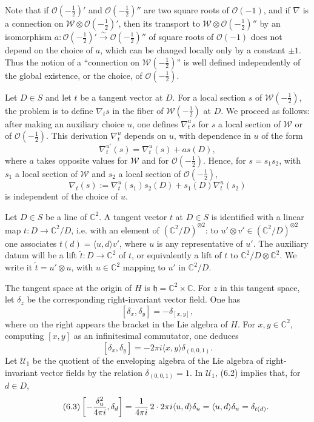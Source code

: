 \documentclass[11pt]{article}
\newcommand{\C}{\mathbb C}
\newcommand{\cO}{\mathcal O}
\newcommand{\cW}{\mathcal W}
\newcommand{\half}{\tfrac12}
\begin{document}
Note that if $\cO(-\half)'$ and $\cO(-\half)''$ are two square roots of $\cO(-1)$, and if $\nabla$ is a connection on $\cW\otimes\cO(-\half)'$, then its transport to $\cW\otimes\cO(-\half)''$ by an isomorphism $a:\cO(-\half)'\xrightarrow{\sim}\cO(-\half)''$ of square roots of $\cO(-1)$ does not depend on the choice of $a$, which can be changed locally only by a constant $\pm1$. Thus the notion of a ``connection on $\cW(-\half)$'' is well defined independently of the global existence, or the choice, of $\cO(-\half)$.

Let $D\in S$ and let $t$ be a tangent vector at $D$. For a local section $s$ of $\cW(-\half)$, the problem is to define $\nabla_t s$ in the fiber of $\cW(-\half)$ at $D$. We proceed as follows: after making an auxiliary choice $u$, one defines $\nabla^u_t s$ for $s$ a local section of $\cW$ or of $\cO(-\half)$. This derivation $\nabla^u_t$ depends on $u$, with dependence in $u$ of the form
\[
\nabla^{u'}_t(s)=\nabla^u_t(s)+a s(D),
\]
where $a$ takes opposite values for $\cW$ and for $\cO(-\half)$. Hence, for $s=s_1s_2$, with $s_1$ a local section of $\cW$ and $s_2$ a local section of $\cO(-\half)$,
\[
\nabla_t(s):=\nabla^u_t(s_1)s_2(D)+s_1(D)\nabla^u_t(s_2)
\]
is independent of the choice of $u$.

Let $D\in S$ be a line of $\C^2$. A tangent vector $t$ at $D\in S$ is identified with a linear map $t:D\to\C^2/D$, i.e. with an element of $(\C^2/D)^{\otimes2}$: to $u'\otimes v'\in(\C^2/D)^{\otimes2}$ one associates $t(d)=\langle u,d\rangle v'$, where $u$ is any representative of $u'$. The auxiliary datum will be a lift $\tilde t:D\to\C^2$ of $t$, or equivalently a lift of $t$ to $\C^2/D\otimes\C^2$. We write it $\tilde t=u'\otimes u$, with $u\in\C^2$ mapping to $u'$ in $\C^2/D$.

The tangent space at the origin of $H$ is $\mathfrak h=\C^2\times\C$. For $z$ in this tangent space, let $\delta_z$ be the corresponding right-invariant vector field. One has
\[
[\delta_x,\delta_y]=-\delta_{[x,y]},
\]
where on the right appears the bracket in the Lie algebra of $H$. For $x,y\in\C^2$, computing $[x,y]$ as an infinitesimal commutator, one deduces
\begin{equation}\tag{6.2}
[\delta_x,\delta_y]=-2\pi i\langle x,y\rangle\delta_{(0,0,1)}.
\end{equation}
Let $\mathcal U_1$ be the quotient of the enveloping algebra of the Lie algebra of right-invariant vector fields by the relation $\delta_{(0,0,1)}=1$. In $\mathcal U_1$, (6.2) implies that, for $d\in D$,
\begin{equation}\tag{6.3}
\left[-{\delta_u^2\over4\pi i},\delta_d\right]
={1\over4\pi i}\,2\cdot 2\pi i\langle u,d\rangle\delta_u
=\langle u,d\rangle\delta_u=\delta_{t(d)}.
\end{equation}
\end{document}
